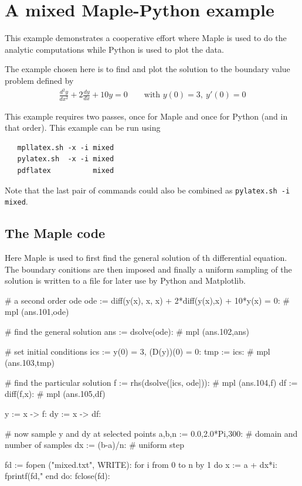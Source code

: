 \documentclass[12pt]{article}
\begin{document}
\section*{A mixed Maple-Python example}

This example demonstrates a cooperative effort where Maple is used to do the analytic computations while Python is used to plot the data.

The example chosen here is to find and plot the solution to the boundary value problem defined by
\begin{align*}
   \frac{d^2y}{dx^2} + 2 \frac{dy}{dx} +10 y = 0\quad\quad\text{with }y(0)=3,\> y'(0)=0
\end{align*}

This example requires two passes, once for Maple and once for Python (and in that order). This example can be run using

\vspace{5pt}

\begin{lstlisting}
   mpllatex.sh -x -i mixed
   pylatex.sh  -x -i mixed
   pdflatex          mixed
\end{lstlisting}

\vspace{5pt}

Note that the last pair of commands could also be combined as {\small\tt pylatex.sh -i mixed}.

\subsection*{The Maple code}

Here Maple is used to first find the general solution of th differential equation. The boundary conitions are then imposed and finally a uniform sampling of the solution is written to a file for later use by Python and Matplotlib.

\begin{maple}
   # a second order ode
   ode := diff(y(x), x, x) + 2*diff(y(x),x) + 10*y(x) = 0:  # mpl (ans.101,ode)

   # find the general solution
   ans := dsolve(ode):                     # mpl (ans.102,ans)

   # set initial conditions
   ics := y(0) = 3, (D(y))(0) = 0:
   tmp := {ics}:                           # mpl (ans.103,tmp)

   # find the particular solution
    f := rhs(dsolve([ics, ode])):          # mpl (ans.104,f)
   df := diff(f,x):                        # mpl (ans.105,df)

    y := x -> f:
   dy := x -> df:

   # now sample y and dy at selected points
   a,b,n := 0.0,2.0*Pi,300:        # domain and number of samples
   dx := (b-a)/n:                  # uniform step

   fd := fopen ("mixed.txt", WRITE):
   for i from 0 to n by 1 do
      x := a + dx*i:
      fprintf(fd,"%
   end do:
   fclose(fd):
\end{maple}
\end{document}
